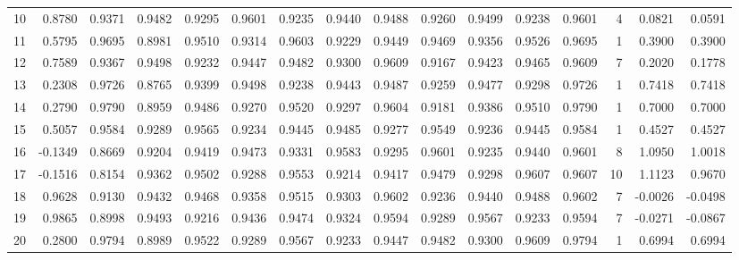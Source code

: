 \begin{tabular}{lrrrrrrrrrrrrrrr}
10  &      0.8780 &  0.9371 &  0.9482 &  0.9295 &  0.9601 &  0.9235 &  0.9440 &  0.9488 &  0.9260 &  0.9499 &   0.9238 &     0.9601 &      4 &                    0.0821 &                     0.0591 \\
11  &      0.5795 &  0.9695 &  0.8981 &  0.9510 &  0.9314 &  0.9603 &  0.9229 &  0.9449 &  0.9469 &  0.9356 &   0.9526 &     0.9695 &      1 &                    0.3900 &                     0.3900 \\
12  &      0.7589 &  0.9367 &  0.9498 &  0.9232 &  0.9447 &  0.9482 &  0.9300 &  0.9609 &  0.9167 &  0.9423 &   0.9465 &     0.9609 &      7 &                    0.2020 &                     0.1778 \\
13  &      0.2308 &  0.9726 &  0.8765 &  0.9399 &  0.9498 &  0.9238 &  0.9443 &  0.9487 &  0.9259 &  0.9477 &   0.9298 &     0.9726 &      1 &                    0.7418 &                     0.7418 \\
14  &      0.2790 &  0.9790 &  0.8959 &  0.9486 &  0.9270 &  0.9520 &  0.9297 &  0.9604 &  0.9181 &  0.9386 &   0.9510 &     0.9790 &      1 &                    0.7000 &                     0.7000 \\
15  &      0.5057 &  0.9584 &  0.9289 &  0.9565 &  0.9234 &  0.9445 &  0.9485 &  0.9277 &  0.9549 &  0.9236 &   0.9445 &     0.9584 &      1 &                    0.4527 &                     0.4527 \\
16  &     -0.1349 &  0.8669 &  0.9204 &  0.9419 &  0.9473 &  0.9331 &  0.9583 &  0.9295 &  0.9601 &  0.9235 &   0.9440 &     0.9601 &      8 &                    1.0950 &                     1.0018 \\
17  &     -0.1516 &  0.8154 &  0.9362 &  0.9502 &  0.9288 &  0.9553 &  0.9214 &  0.9417 &  0.9479 &  0.9298 &   0.9607 &     0.9607 &     10 &                    1.1123 &                     0.9670 \\
18  &      0.9628 &  0.9130 &  0.9432 &  0.9468 &  0.9358 &  0.9515 &  0.9303 &  0.9602 &  0.9236 &  0.9440 &   0.9488 &     0.9602 &      7 &                   -0.0026 &                    -0.0498 \\
19  &      0.9865 &  0.8998 &  0.9493 &  0.9216 &  0.9436 &  0.9474 &  0.9324 &  0.9594 &  0.9289 &  0.9567 &   0.9233 &     0.9594 &      7 &                   -0.0271 &                    -0.0867 \\
20  &      0.2800 &  0.9794 &  0.8989 &  0.9522 &  0.9289 &  0.9567 &  0.9233 &  0.9447 &  0.9482 &  0.9300 &   0.9609 &     0.9794 &      1 &                    0.6994 &                     0.6994 \\

\end{tabular}
